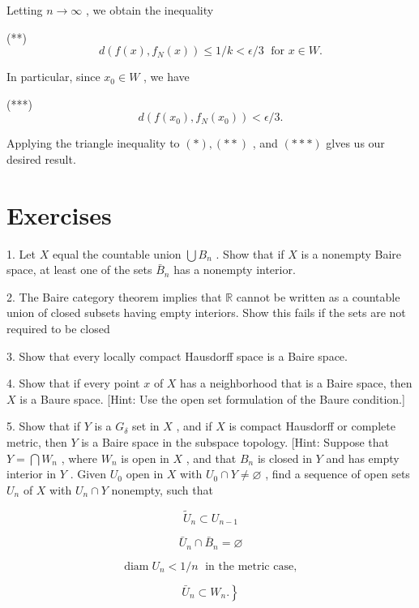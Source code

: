 \documentclass[10pt]{article}
\begin{document}
Letting \(n \rightarrow  \infty\) , we obtain the inequality

(**)
\[
d\left( {f\left( x\right) ,{f}_{N}\left( x\right) }\right)  \leq  1/k < \epsilon /3\;\text{ for }x \in  W.
\]

In particular, since \({x}_{0} \in  W\) , we have

(***)
\[
d\left( {f\left( {x}_{0}\right) ,{f}_{N}\left( {x}_{0}\right) }\right)  < \epsilon /3.
\]

Applying the triangle inequality to \(\left( *\right) ,\left( {* * }\right)\) , and \(\left( {* *  * }\right)\) glves us our desired result.

\section*{Exercises}

1. Let \(X\) equal the countable union \(\bigcup {B}_{n}\) . Show that if \(X\) is a nonempty Baire space, at least one of the sets \({\bar{B}}_{n}\) has a nonempty interior.

2. The Baire category theorem implies that \(\mathbb{R}\) cannot be written as a countable union of closed subsets having empty interiors. Show this fails if the sets are not required to be closed

3. Show that every locally compact Hausdorff space is a Baire space.

4. Show that if every point \(x\) of \(X\) has a neighborhood that is a Baire space, then \(X\) is a Baure space. [Hint: Use the open set formulation of the Baure condition.]

5. Show that if \(Y\) is a \({G}_{\delta }\) set in \(X\) , and if \(X\) is compact Hausdorff or complete metric, then \(Y\) is a Baire space in the subspace topology. [Hint: Suppose that \(Y = \bigcap {W}_{n}\) , where \({W}_{n}\) is open in \(X\) , and that \({B}_{n}\) is closed in \(Y\) and has empty interior in \(Y\) . Given \({U}_{0}\) open in \(X\) with \({U}_{0} \cap  Y \neq  \varnothing\) , find a sequence of open sets \({U}_{n}\) of \(X\) with \({U}_{n} \cap  Y\) nonempty, such that

\[
{\widetilde{U}}_{n} \subset  {U}_{n - 1}
\]

\[
{\bar{U}}_{n} \cap  {\bar{B}}_{n} = \varnothing
\]

\[
\operatorname{diam}{U}_{n} < 1/n\;\text{ in the metric case, }
\]

\[
\left. {{\bar{U}}_{n} \subset  {W}_{n}.}\right\}
\]
\end{document}
